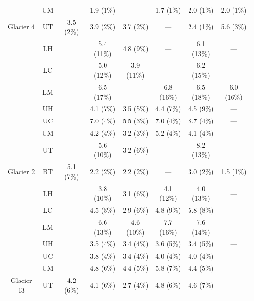 \documentclass{sfuthesis}
\begin{document}
\begin{appendices}
\begin{table}[h]
\begin{tabular}{cccccccc}
  & UM &   & 1.9   (1\%)& --- & 1.7   (1\%)& 2.0 (1\%) & 2.0 (1\%)\\
  
\multirow{-7}{*}{ Glacier 4} & UT & \multirow{-7}{*}{ 3.5 (2\%)} & 3.9 (2\%)& 3.7 (2\%) & --- & 2.4 (1\%)& 5.6 (3\%)\\ \hline
 & LH &  & 5.4 (11\%)& 4.8 (9\%)& --- & 6.1 (13\%)& --- \\ 
 & LC &  & 5.0 (12\%)& 3.9 (11\%)& --- & 6.2 (15\%)& --- \\
 & LM &  & 6.5 (17\%)& --- & 6.8 (16\%)& 6.5 (18\%)& 6.0 (16\%)\\
 & UH &  & 4.1 (7\%)& 3.5 (5\%)& 4.4 (7\%)& 4.5 (9\%)& --- \\
 & UC &  & 7.0 (4\%)& 5.5 (3\%)& 7.0 (4\%)& 8.7 (4\%)& --- \\
 & UM &  & 4.2 (4\%)& 3.2 (3\%)& 5.2 (4\%)& 4.1 (4\%)& --- \\
 & UT &  & 5.6 (10\%)& 3.2 (6\%)& --- & 8.2 (13\%)& --- \\
\multirow{-8}{*}{Glacier 2} & BT & \multirow{-8}{*}{5.1 (7\%)} & 2.2 (2\%)& 2.2 (2\%)& --- & 3.0 (2\%)& 1.5 (1\%) \\ \hline
  
  & LH &   & 3.8 (10\%)& 3.1 (6\%)& 4.1 (12\%) & 4.0 (13\%)& --- \\ 
  
  & LC &   & 4.5 (8\%)& 2.9 (6\%)& 4.8 (9\%)& 5.8 (8\%)& --- \\
  
  & LM &   & 6.6 (13\%)& 4.6 (10\%)& 7.7 (16\%)& 7.6 (14\%)& --- \\
  
  & UH &   & 3.5 (4\%)& 3.4 (4\%)& 3.6 (5\%)& 3.4 (5\%)& --- \\
  
  & UC &   & 3.8 (4\%)& 3.4 (4\%)& 4.0 (4\%)& 4.0 (4\%)& --- \\
  
  & UM &   & 4.8 (6\%)& 4.4 (5\%)& 5.8 (7\%) & 4.4 (5\%) & --- \\
  
\multirow{-7}{*}{ Glacier 13} & UT & \multirow{-7}{*}{ 4.2 (6\%)} & 4.1 (6\%)& 2.7 (4\%)& 4.8 (6\%)& 4.6 (7\%)& ---
\end{tabular}
\end{table}



\end{appendices}
\end{document}

